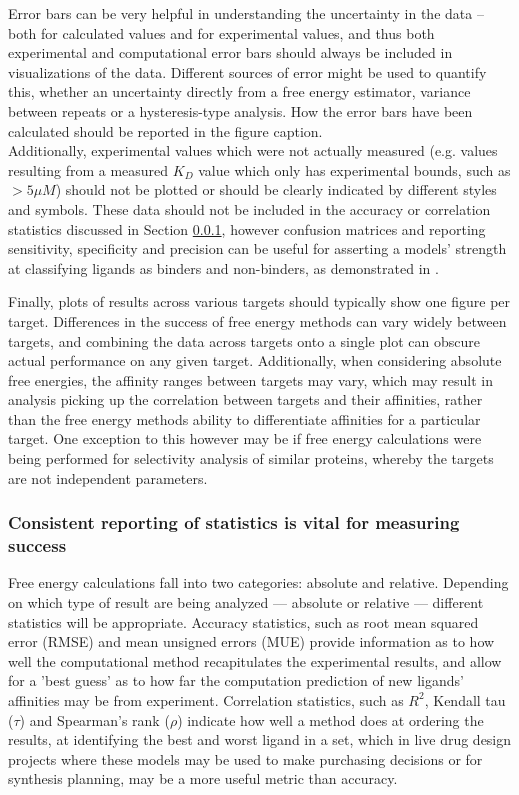 \documentclass[9pt,bestpractices]{livecoms}
\begin{document}
Error bars can be very helpful in understanding the uncertainty in the data -- both for calculated values and for experimental values, and thus both experimental and computational error bars should always be included in visualizations of the data. Different sources of error might be used to quantify this, whether an uncertainty directly from a free energy estimator, variance between repeats or a hysteresis-type analysis. How the error bars have been calculated should be reported in the figure caption.\\


Additionally, experimental values which were not actually measured (e.g. values resulting from a measured $K_D$ value which only has experimental bounds, such as $> 5 \mu M$) should not be plotted or should be clearly indicated by different styles and symbols. These data should not be included in the accuracy or correlation statistics discussed in Section \ref{sec:statistical_analysis}, however confusion matrices and reporting sensitivity, specificity and precision can be useful for asserting a models' strength at classifying ligands as binders and non-binders, as demonstrated in \cite{hauserPredictingResistanceClinical2018}.

Finally, plots of results across various targets should typically show one figure per target. Differences in the success of free energy methods can vary widely between targets, and combining the data across targets onto a single plot can obscure actual performance on any given target. Additionally, when considering absolute free energies, the affinity ranges between targets may vary, which may result in analysis picking up the correlation between targets and their affinities, rather than the free energy methods ability to differentiate affinities for a particular target. One exception to this however may be if free energy calculations were being performed for selectivity analysis of similar proteins, whereby the targets are not independent parameters\cite{aldeghiPredictionsLigandSelectivity2017}.

\subsubsection{Consistent reporting of statistics is vital for measuring success}
\label{sec:statistical_analysis}
Free energy calculations fall into two categories: absolute and relative. Depending on which type of result are being analyzed --- absolute or relative --- different statistics will be appropriate. Accuracy statistics, such as root mean squared error (RMSE) and mean unsigned errors (MUE) provide information as to how well the computational method recapitulates the experimental results, and allow for a 'best guess' as to how far the computation prediction of new ligands' affinities may be from experiment. Correlation statistics, such as $R^{2}$, Kendall tau ($\tau$) and Spearman's rank ($\rho$) indicate how well a method does at ordering the results, at identifying the best and worst ligand in a set, which in live drug design projects where these models may be used to make purchasing decisions or  for synthesis planning, may be a more useful metric than accuracy.\\
\end{document}
